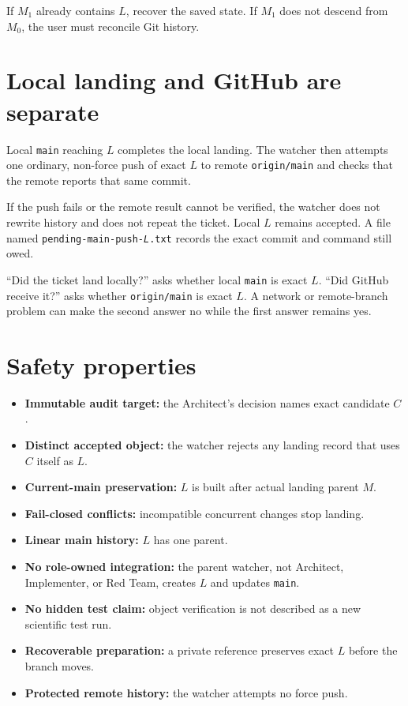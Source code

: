 \documentclass[10pt,twocolumn]{article}
\newcommand{\code}[1]{\texttt{#1}}
\newcommand{\term}[1]{\textbf{#1}}
\begin{document}
If $M_1$ already contains $L$, recover the saved state. If $M_1$ does not
descend from $M_0$, the user must reconcile Git history.

\section{Local landing and GitHub are separate}

Local \code{main} reaching $L$ completes the local landing. The watcher then
attempts one ordinary, non-force push of exact $L$ to remote
\code{origin/main} and checks that the remote reports that same commit.

If the push fails or the remote result cannot be verified, the watcher does
not rewrite history and does not repeat the ticket. Local $L$ remains
accepted. A file named
\code{pending-main-push-\textit{L}.txt} records the exact commit and command
still owed.

\begin{keybox}
``Did the ticket land locally?'' asks whether local \code{main} is exact $L$.
``Did GitHub receive it?'' asks whether \code{origin/main} is exact $L$. A
network or remote-branch problem can make the second answer no while the first
answer remains yes.
\end{keybox}

\section{Safety properties}

\begin{itemize}
  \item \term{Immutable audit target:} the Architect's decision names exact candidate $C$.
  \item \term{Distinct accepted object:} the watcher rejects any landing record that uses $C$ itself as $L$.
  \item \term{Current-main preservation:} $L$ is built after actual landing parent $M$.
  \item \term{Fail-closed conflicts:} incompatible concurrent changes stop landing.
  \item \term{Linear main history:} $L$ has one parent.
  \item \term{No role-owned integration:} the parent watcher, not Architect, Implementer, or Red Team, creates $L$ and updates \code{main}.
  \item \term{No hidden test claim:} object verification is not described as a new scientific test run.
  \item \term{Recoverable preparation:} a private reference preserves exact $L$ before the branch moves.
  \item \term{Protected remote history:} the watcher attempts no force push.
\end{itemize}
\end{document}
